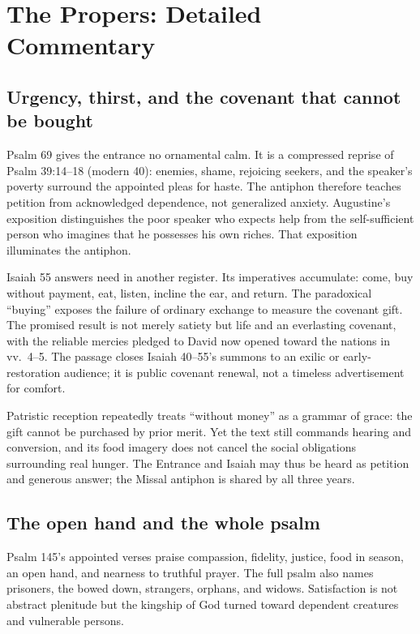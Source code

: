 \section*{The Propers: Detailed Commentary}

\subsection*{Urgency, thirst, and the covenant that cannot be bought\enspace{}}
Psalm 69 gives the entrance no ornamental calm. It is a compressed reprise of
Psalm 39:14--18 (modern 40): enemies, shame, rejoicing seekers, and the
speaker's poverty surround the appointed pleas for haste. The antiphon
therefore teaches petition from acknowledged dependence, not generalized
anxiety. Augustine's exposition distinguishes the poor speaker who expects
help from the self-sufficient person who imagines that he possesses his own
riches. That exposition illuminates the antiphon.

Isaiah 55 answers need in another register. Its imperatives accumulate:
come, buy without payment, eat, listen, incline the ear, and return. The
paradoxical ``buying'' exposes the failure of ordinary exchange to measure
the covenant gift. The promised result is not merely satiety but life and an
everlasting covenant, with the reliable mercies pledged to David now opened
toward the nations in vv.~4--5. The passage closes Isaiah 40--55's summons to
an exilic or early-restoration audience; it is public covenant renewal, not a
timeless advertisement for comfort.

Patristic reception repeatedly treats ``without money'' as a grammar of
grace: the gift cannot be purchased by prior merit. Yet the text still
commands hearing and conversion, and its food imagery does not cancel the
social obligations surrounding real hunger. The Entrance and Isaiah may thus
be heard as petition and generous answer; the Missal antiphon is shared by all
three years.

\subsection*{The open hand and the whole psalm\enspace{}}
Psalm 145's appointed verses praise compassion, fidelity, justice, food in season, an open hand, and nearness to truthful prayer. The full psalm also names prisoners, the bowed down, strangers, orphans, and widows. Satisfaction is not abstract plenitude but the kingship of God turned toward dependent creatures and vulnerable persons.

